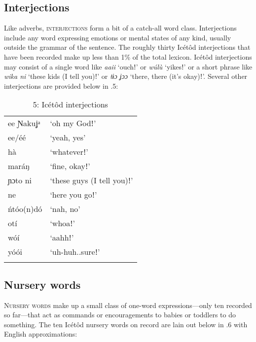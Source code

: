 \subsection{Interjections}


Like adverbs, \textsc{interjections} form a bit of a catch-all word class. Interjections include any word expressing emotions or mental states of any kind, usually outside the grammar of the sentence. The roughly thirty Icétôd interjections that have been recorded make up less than 1\% of the total lexicon. Icétôd interjections may consist of a single word like \textit{aaii} ‘ouchǃ’ or \textit{wúlù} ‘yikesǃ’ or a short phrase like \textit{wika ni} ‘these kids (I tell you)ǃ’ or \textit{tɨɔ ʝɔɔ} ‘there, there (it’s okay)ǃ’. Several other interjections are provided below in .5:


\begin{table}
\caption{5: Icétôd interjections}
\label{tab:3}


\begin{tabularx}{\textwidth}{XX}
\lsptoprule

ee Ɲakuʝᵃ & ‘oh my Godǃ’\\
ee/éé & ‘yeah, yes’\\
hà & ‘whateverǃ’\\
maráŋ & ‘fine, okayǃ’\\
ɲɔto ni & ‘these guys (I tell you)ǃ’\\
ne & ‘here you goǃ’\\
ńtóo(n)dó & ‘nah, no’\\
otí & ‘whoaǃ’\\
wóí & ‘aahhǃ’\\
yóói & ‘uh-huh..sureǃ’\\
\lspbottomrule
\end{tabularx}
\end{table}



\subsection{Nursery words}


\textsc{Nursery} \textsc{words} make up a small class of one-word expressions—only ten recorded so far—that act as commands or encouragements to babies or toddlers to do something. The ten Icétôd nursery words on record are lain out below in .6 with English approximations:


